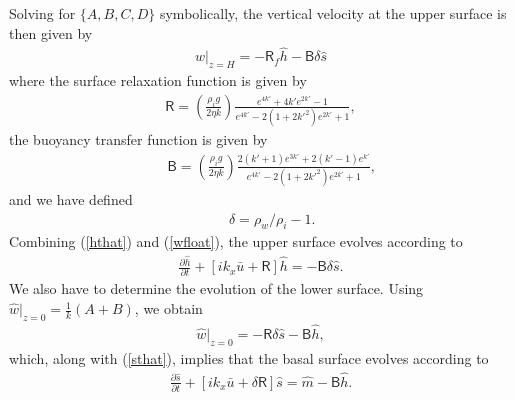 \documentclass[paper=a4, fontsize=11pt]{article} %
\begin{document}
Solving for $\{A,B,C,D\}$ symbolically, the vertical velocity at the upper surface is then given by
\begin{eqnarray}
w|_{z=H} =  -\mathsf{R}_f\widehat{h} - \mathsf{B}\delta\widehat{s} \label{wfloat}
\end{eqnarray}
where the surface relaxation function is given by
\begin{eqnarray}
\mathsf{R} = \left(\frac{\rho_i g}{2\eta k}\right) \frac{e^{4{k'}} +4{k'} e^{2{k'}} -1 }{e^{4{k'}} -2(1+2{k'}^2)e^{2{k'}} +1},
\end{eqnarray}
the buoyancy transfer function is given by
\begin{eqnarray}
&&\mathsf{B} = \left(\frac{\rho_i g}{2\eta k}\right) \frac{ 2({k'}+1)e^{3{k'}}+2({k'}-1)e^{{k'}} }{e^{4{k'}} -2(1+2{k'}^2)e^{2{k'}} +1},
\end{eqnarray}
and we have defined
\begin{eqnarray}
&&\delta = \rho_w/\rho_i -1.
\end{eqnarray}
Combining (\ref{hthat}) and (\ref{wfloat}), the upper surface evolves according to
\begin{eqnarray}
\frac{\partial \widehat{h}}{\partial t}+ \left[ik_x \bar{u}  + \mathsf{R}\right]\widehat{h} = -\mathsf{B}\delta\widehat{s}.
\end{eqnarray}
We also have to determine the evolution of the lower surface.
Using $\widehat{w}|_{z=0}= \frac{1}{k}(A+B)$, we obtain
\begin{eqnarray}
\widehat{w}|_{z=0} = -\mathsf{R}\delta\widehat{s} - \mathsf{B} \widehat{h}, \label{wbfloat}
\end{eqnarray}
which, along with (\ref{sthat}), implies that the basal surface evolves according to
\begin{eqnarray}
\frac{\partial \widehat{s}}{\partial t}+ [ik_x\bar{u} + \delta\mathsf{R}]\widehat{s} = \widehat{m} - \mathsf{B} \widehat{h}.
\end{eqnarray}
%
\end{document}
